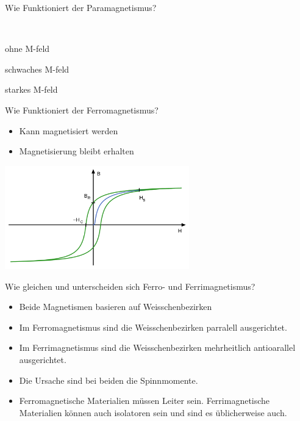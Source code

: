 \begin{karte}{Wie Funktioniert der Paramagnetismus?}
\begin{center}
\begin{minipage}{0.32\textwidth}
		\end{minipage}\\
		\begin{minipage}{0.32\textwidth}
			\center ohne M-feld
		\end{minipage}
		\begin{minipage}{0.32\textwidth}
			\center schwaches M-feld
		\end{minipage}
		\begin{minipage}{0.32\textwidth}
			\center starkes M-feld
		\end{minipage}
	\end{center}
\end{karte}

\begin{karte}{Wie Funktioniert der Ferromagnetismus?}
	\begin{itemize}
		\item Kann magnetisiert werden
		\item Magnetisierung bleibt erhalten
	\end{itemize}
	\center \includegraphics[width=0.6\textwidth]{pics/MS_Ferromagnetismus.png}
\end{karte}

\begin{karte}{Wie gleichen und unterscheiden sich Ferro- und Ferrimagnetismus?}
	\begin{itemize}
		\item Beide Magnetismen basieren auf Weisschenbezirken
		\item Im Ferromagnetismus sind die Weisschenbezirken parralell ausgerichtet.
		\item Im Ferrimagnetismus sind die Weisschenbezirken mehrheitlich antioarallel ausgerichtet.
		\item Die Ursache sind bei beiden die Spinnmomente.
		\item Ferromagnetische Materialien müssen Leiter sein. Ferrimagnetische Materialien können auch isolatoren sein und sind es üblicherweise auch.
	\end{itemize}
\end{karte}

